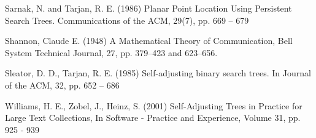 \documentclass[mcs]{scsthesis}
\begin{document}
\begin{thebibliography}{5}
Sarnak, N. and Tarjan, R. E. (1986) Planar Point Location Using Persistent
Search Trees. Communications of the ACM, 29(7), pp. 669 -- 679

Shannon, Claude E. (1948) A Mathematical Theory of Communication,
Bell System Technical Journal, 27, pp. 379--423 and 623--656.

Sleator, D. D., Tarjan, R. E. (1985) Self-adjusting binary search trees.
In Journal of the ACM, 32, pp. 652 – 686

Williams, H. E., Zobel, J., Heinz, S. (2001) Self-Adjusting Trees in Practice
for Large Text Collections, In Software - Practice and Experience,
Volume 31, pp. 925 - 939

\end{thebibliography}
\end{document}
